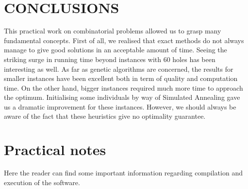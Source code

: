 \documentclass[letterpaper, 10 pt, conference]{ieeeconf}  %
\begin{document}
\section{CONCLUSIONS}
This practical work on combinatorial problems allowed us to grasp many fundamental concepts. First of all, we realised that exact methods do not always manage to give good solutions in an acceptable amount of time. Seeing the striking surge in running time beyond instances with 60 holes has been interesting as well. \newline 
As far as genetic algorithms are concerned, the results for smaller instances have been excellent both in term of quality and computation time. On the other hand, bigger instances required much more time to approach the optimum. Initialising some individuals by way of Simulated Annealing gave us a dramatic improvement for these instances. \newline However, we should always be aware of the fact that these heuristics give no optimality guarantee.


\addtolength{\textheight}{-12cm}   %







\section*{Practical notes}
Here the reader can find some important information regarding 
compilation and execution of the software.
\end{document}
